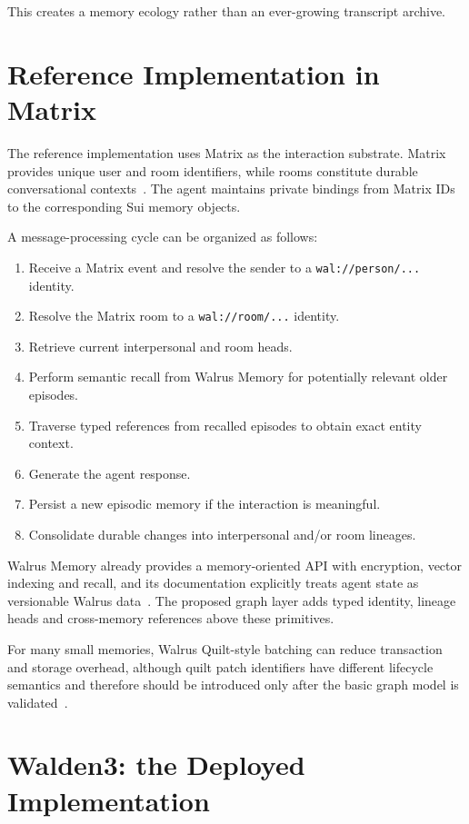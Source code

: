 \documentclass[11pt]{article}
\begin{document}
This creates a memory ecology rather than an ever-growing transcript archive.

\section{Reference Implementation in Matrix}

The reference implementation uses Matrix as the interaction substrate. Matrix provides unique user and room identifiers, while rooms constitute durable conversational contexts~\cite{matrix-spec}. The agent maintains private bindings from Matrix IDs to the corresponding Sui memory objects.

A message-processing cycle can be organized as follows:

\begin{enumerate}
    \item Receive a Matrix event and resolve the sender to a \texttt{wal://person/...} identity.
    \item Resolve the Matrix room to a \texttt{wal://room/...} identity.
    \item Retrieve current interpersonal and room heads.
    \item Perform semantic recall from Walrus Memory for potentially relevant older episodes.
    \item Traverse typed references from recalled episodes to obtain exact entity context.
    \item Generate the agent response.
    \item Persist a new episodic memory if the interaction is meaningful.
    \item Consolidate durable changes into interpersonal and/or room lineages.
\end{enumerate}

Walrus Memory already provides a memory-oriented API with encryption, vector indexing and recall, and its documentation explicitly treats agent state as versionable Walrus data~\cite{walrus-lineage,walrus-memory-api}. The proposed graph layer adds typed identity, lineage heads and cross-memory references above these primitives.

For many small memories, Walrus Quilt-style batching can reduce transaction and storage overhead, although quilt patch identifiers have different lifecycle semantics and therefore should be introduced only after the basic graph model is validated~\cite{walrus-agent-loop}.

\section{Walden3: the Deployed Implementation}
\end{document}
